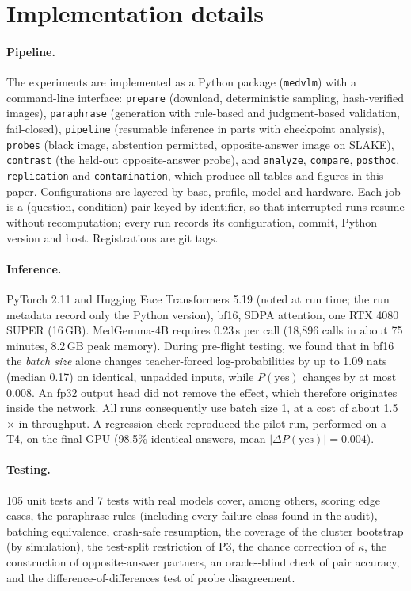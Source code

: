 \documentclass[10pt,twocolumn,letterpaper]{article}
\begin{document}
\appendix
\section{Implementation details}
\label{sec:impl}
\paragraph{Pipeline.} The experiments are implemented as a Python package (\texttt{medvlm}) with a command-line
interface: \texttt{prepare} (download, deterministic sampling, hash-verified images), \texttt{paraphrase}
(generation with rule-based and judgment-based validation, fail-closed), \texttt{pipeline} (resumable inference in
parts with checkpoint analysis), \texttt{probes} (black image, abstention permitted, opposite-answer image on SLAKE), \texttt{contrast}
(the held-out opposite-answer probe), and \texttt{analyze},
\texttt{compare}, \texttt{posthoc}, \texttt{replication} and \texttt{contamination}, which produce all tables and
figures in this paper. Configurations are layered by base, profile, model and hardware. Each job is a (question,
condition) pair keyed by identifier, so that interrupted runs resume without recomputation; every run records its
configuration, commit, Python version and host. Registrations are git tags.

\paragraph{Inference.} PyTorch 2.11 and Hugging Face Transformers 5.19 (noted at run time; the run metadata record only the Python version), bf16, SDPA attention, one RTX 4080 SUPER
(16\,GB). MedGemma-4B requires 0.23\,s per call (18,896 calls in about 75 minutes, 8.2\,GB peak memory). During
pre-flight testing, we found that in bf16 the \emph{batch size} alone changes teacher-forced log-probabilities by up
to 1.09 nats (median 0.17) on identical, unpadded inputs, while $P(\text{yes})$ changes by at most 0.008. An fp32
output head did not remove the effect, which therefore originates inside the network. All runs consequently use
batch size 1, at a cost of about 1.5$\times$ in throughput. A regression check reproduced the pilot run, performed
on a T4, on the final GPU (98.5\% identical answers, mean $|\Delta P(\text{yes})|=0.004$).

\paragraph{Testing.} 105 unit tests and 7 tests with real models cover, among others, scoring edge cases, the
paraphrase rules (including every failure class found in the audit), batching equivalence, crash-safe resumption,
the coverage of the cluster bootstrap (by simulation), the test-split restriction of P3, the chance correction of
$\kappa$, the construction of opposite-answer partners, an oracle-\vs-blind check of pair accuracy, and the
difference-of-differences test of probe disagreement.
\end{document}
